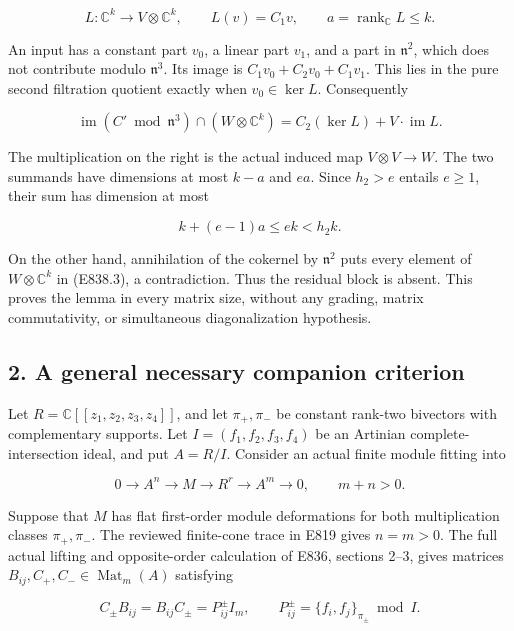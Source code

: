 \[
 L:\mathbb C^k\longrightarrow V\otimes\mathbb C^k,\qquad L(v)=C_1v,
 \qquad a=\operatorname{rank}_{\mathbb C}L\le k.
 \tag{E838.2}
\]

An input has a constant part \(v_0\), a linear part \(v_1\), and a part
in \(\mathfrak n^2\), which does not contribute modulo
\(\mathfrak n^3\). Its image is \(C_1v_0+C_2v_0+C_1v_1\). This lies in
the pure second filtration quotient exactly when \(v_0\in\ker L\).
Consequently

\[
 \operatorname{im}(C'\bmod\mathfrak n^3)\cap(W\otimes\mathbb C^k)
   =C_2(\ker L)+V\cdot\operatorname{im}L.
 \tag{E838.3}
\]

The multiplication on the right is the actual induced map
\(V\otimes V\to W\). The two summands have dimensions at most \(k-a\)
and \(ea\). Since \(h_2>e\) entails \(e\ge1\), their sum has dimension
at most

\[
 k+(e-1)a\le ek<h_2k.
 \tag{E838.4}
\]

On the other hand, annihilation of the cokernel by \(\mathfrak n^2\)
puts every element of \(W\otimes\mathbb C^k\) in (E838.3), a
contradiction. Thus the residual block is absent. This proves the lemma
in every matrix size, without any grading, matrix commutativity, or
simultaneous diagonalization hypothesis.

\subsection{2. A general necessary companion
criterion}\label{SF-E838:a-general-necessary-companion-criterion}

Let \(R=\mathbb C[[z_1,z_2,z_3,z_4]]\), and let \(\pi_+,\pi_-\) be
constant rank-two bivectors with complementary supports. Let
\(I=(f_1,f_2,f_3,f_4)\) be an Artinian complete-intersection ideal, and
put \(A=R/I\). Consider an actual finite module fitting into

\[
 0\longrightarrow A^n\longrightarrow M\longrightarrow R^r
       \longrightarrow A^m\longrightarrow0,\qquad m+n>0.
 \tag{E838.5}
\]

Suppose that \(M\) has flat first-order module deformations for both
multiplication classes \(\pi_+,\pi_-\). The reviewed finite-cone trace
in E819 gives \(n=m>0\). The full actual lifting and opposite-order
calculation of E836, sections 2--3, gives matrices
\(B_{ij},C_+,C_-\in\operatorname{Mat}_m(A)\) satisfying

\[
 C_\pm B_{ij}=B_{ij}C_\pm=P^\pm_{ij}I_m,
 \qquad P^\pm_{ij}=\{f_i,f_j\}_{\pi_\pm}\bmod I.
 \tag{E838.6}
\]

